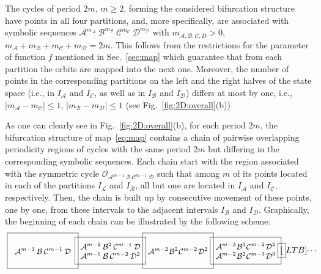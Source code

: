 \documentclass[10pt]{article}
\renewcommand{\L}{{\mathcal L}}
\newcommand{\A}{{\mathcal A}}
\newcommand{\B}{{\mathcal B}}
\newcommand{\C}{{\mathcal C}}
\newcommand{\D}{{\mathcal D}}
\newcommand{\R}{{\mathcal R}}
\newcommand{\LC}{{\mathcal O}}
\renewcommand{\leq}{\leqslant}
\renewcommand{\geq}{\geqslant}
\begin{document}
The cycles of period $2m$, $m\geq 2$, forming the considered
bifurcation structure have points in all four partitions, and, more
specifically, are associated with symbolic sequences
$\A^{m_\A}\:\B^{m_\B}\:\C^{m_\C}\:\D^{m_\D}$ with $m_{\A,\B,\C,D}>0$,
$m_\A+m_\B+m_\C+m_\D=2m$.  This follows from the restrictions for the
parameter of function $f$ mentioned in Sec.~\ref{sec:map} which
guarantee that from each partition the orbits are mapped into the next
one.  Moreover, the number of points in the corresponding partitions
on the left and the right halves of the state space (i.e., in $I_\A$
and $I_\C$, as well as in $I_\B$ and $I_\D$) differs at most by one,
i.e., $|m_\A-m_\C|\leq 1$, $|m_\B-m_\D|\leq 1$ (see
Fig.~\ref{fig:2D:overall}(b))

As one can clearly see in Fig.~\ref{fig:2D:overall}(b), for each
period $2m$, the bifurcation structure of map~\eqref{eq:map} contains
a chain of pairwise overlapping periodicity regions of cycles with the
same period $2m$ but differing in the corresponding symbolic
sequences. Each chain start with the region associated with the
symmetric cycle $\LC_{\A^{m-1}\:\B\:\C^{m-1}\:\D}$ such that among $m$
of its points located in each of the partitions $I_\L$ and $I_\R$, all
but one are located in $I_\A$ and $I_\C$, respectively. Then, the
chain is built up by consecutive movement of these points, one by one,
from these intervals to the adjacent intervals $I_\B$ and
$I_\D$. Graphically, the beginning of each chain can be illustrated by
the following scheme:
\begin{equation}
	\fbox{
		\begin{minipage}[c][3.5em][c]{7em}\small\centering
			$\A^{m-1}\:\B\:\C^{m-1}\:\D$
		\end{minipage}
	}
	\hspace*{-1ex}
	\fbox{
		\begin{minipage}[c][2.5em][c]{7em}\small\centering
			$\A^{m-2}\:\B^2\:\C^{m-1}\:\D$\\
			$\A^{m-1}\:\B  \:\C^{m-2}\:\D^2$
		\end{minipage}
	}
	\hspace*{-1ex}
	\fbox{
		\begin{minipage}[c][3.5em][c]{7em}\small\centering
			$\A^{m-2}\:\B^2\:\C^{m-2}\:\D^2$
		\end{minipage}
	}
	\hspace*{-1ex}
	\fbox{
		\begin{minipage}[c][2.5em][c]{7em}\small\centering
			$\A^{m-3}\:\B^3\:\C^{m-2}\:\D^2$\\
			$\A^{m-2}\:\B^2\:\C^{m-3}\:\D^3$
		\end{minipage}
	}
	\hspace*{-1ex}
	\fbox[LTB]{
		\begin{minipage}[c][3.5em][c]{1ex}\small
			\dots
		\end{minipage}
	}
\end{equation}
\end{document}
